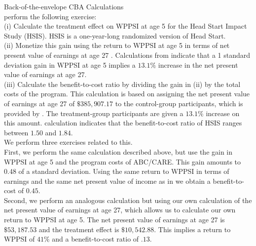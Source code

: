 



\doublespacing

\noindent Back-of-the-envelope CBA Calculations \\

\noindent \citet{Kline-Walters_2016_QJE} perform the following exercise:\\

\noindent (i)  Calculate the treatment effect on WPPSI at age 5 for the Head Start Impact Study (HSIS). HSIS is a one-year-long randomized version of Head Start.\\

\noindent (ii) Monetize this gain using the return to WPPSI at age 5 in terms of net present value of earnings at age 27 \citep{Chetty_Friedman_etal_2010_HowDoesYour}. Calculations from \citet{Chetty_Friedman_etal_2010_HowDoesYour} indicate that a 1 standard deviation gain in WPPSI at age 5 implies a $13.1\%$ increase in the net present value of earnings at age 27.\\

\noindent (iii) Calculate the benefit-to-cost ratio by dividing the gain in (ii) by the total costs of the program. This calculation is based on assigning the net present value of earnings at age 27 of $\$385,907.17$ to the control-group participants, which is provided by \citet{Chetty_Friedman_etal_2010_HowDoesYour}. The treatment-group participants are given a $13.1\%$ increase on this amount. \citet{Kline-Walters_2016_QJE} calculation indicates that the benefit-to-cost ratio of HSIS ranges between $1.50$ and $1.84$.\\ 

\noindent We perform three exercises related to this.\\

\noindent First, we perform the same calculation described above, but use the gain in WPPSI at age 5 and the program costs of ABC/CARE. This gain amounts to 0.48 of a standard deviation. Using the same return to WPPSI in terms of earnings and the same net present value of income as in\citet{Chetty_Friedman_etal_2010_HowDoesYour} we obtain a benefit-to-cost of $0.45$.\\

\noindent Second, we perform an analogous calculation but using our own calculation of the net present value of earnings at age 27, which allows us to calculate our own return to WPPSI at age 5. The net present value of earnings at age 27 is $\$53,187.53$ and the treatment effect is $\$10,542.88$. This implies a return to WPPSI of $41\%$ and a benefit-to-cost ratio of $.13$.\\

